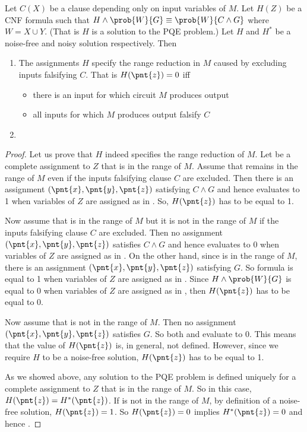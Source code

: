 \begin{proposition}
Let $C(X)$ be a clause depending only on input variables of $M$.  Let
$H(Z)$ be a CNF formula such that $H \wedge \prob{W}{G} \equiv
\prob{W}{C \wedge G}$ where $W = X \cup Y$. (That is $H$ is a solution
to the PQE problem.)  Let $H$ and $H^*$  be  a noise-free and noisy 
solution respectively.  Then
\begin{enumerate}
\item The assignments  $H$ specify the range reduction
  in $M$ caused by excluding inputs falsifying $C$. That is $H(\pnt{z})=0$
  iff
\begin{itemize}
   \item there is an input  for which circuit $M$ produces
   output  
   \item all inputs for which $M$ produces
   output  falsify $C$
\end{itemize}
\item {}
\end{enumerate}
\end{proposition}
\begin{proof}
 Let us prove that $H$ indeed specifies the range
reduction of $M$. Let  be a complete assignment to $Z$ that is
in the range of $M$.  Assume that  remains in the range of $M$
even if the inputs falsifying clause $C$ are excluded. Then there is
an assignment $(\pnt{x},\pnt{y},\pnt{z})$ satisfying $C \wedge G$ and
hence  evaluates to 1 when variables of $Z$ are
assigned as in . So, $H(\pnt{z})$ has to be equal to 1.

Now assume that  is in the range of $M$ but it is not in the
range of $M$ if the inputs falsifying clause $C$ are excluded. Then no
assignment $(\pnt{x},\pnt{y},\pnt{z})$ satisfies $C \wedge G$ and
hence  evaluates to 0 when variables of $Z$ are
assigned as in . On the other hand, since  is in the
range of $M$, there is an assignment $(\pnt{x},\pnt{y},\pnt{z})$
satisfying $G$.  So formula  is equal to 1 when variables
of $Z$ are assigned as in . Since $H \wedge \prob{W}{G}$ is
equal to 0 when variables of $Z$ are assigned as in , then
$H(\pnt{z})$ has to be equal to 0.

 Now assume that  is not in the range of $M$. Then no
 assignment $(\pnt{x},\pnt{y},\pnt{z})$ satisfies $G$. So
 both  and  evaluate to 0. This means
 that the value of $H(\pnt{z})$ is, in general, not defined. However,
 since we require $H$ to be a noise-free solution, $H(\pnt{z})$ has to
 be equal to 1.

 As we showed above, any solution to the PQE
problem is defined uniquely for a complete assignment  to $Z$
that is in the range of $M$. So in this case,
$H(\pnt{z})=H^*(\pnt{z})$.  If  is not in the range of $M$, by
definition of a noise-free solution, $H(\pnt{z})=1$.  So
$H(\pnt{z})=0$ implies $H^*(\pnt{z})=0$  and hence .
\end{proof}

